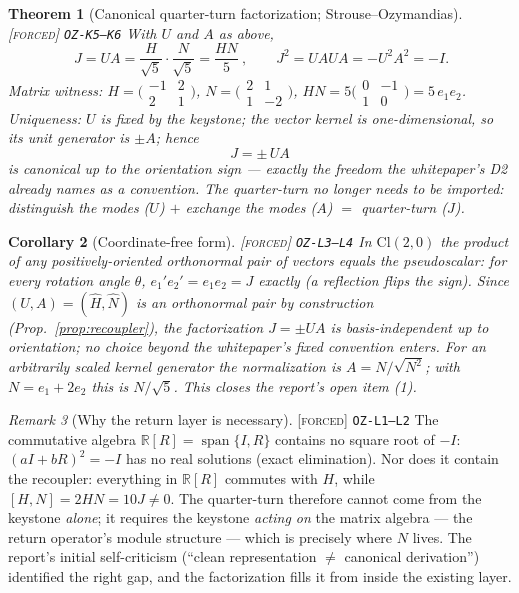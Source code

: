 \documentclass[11pt]{article}
\newcommand{\tagF}{\textcolor{cF}{\textsc{[forced]}}}
\newcommand{\hx}[1]{\textcolor{cC}{\footnotesize\texttt{#1}}}
\newcommand{\R}{\mathbb{R}}
\theoremstyle{plain}
\newtheorem{theorem}{Theorem}[section]
\newtheorem{corollary}[theorem]{Corollary}
\theoremstyle{definition}
\theoremstyle{remark}
\newtheorem{remark}[theorem]{Remark}
\begin{document}
\begin{theorem}[Canonical quarter-turn factorization; Strouse--Ozymandias]\label{thm:factorization}\tagF{} \hx{OZ-K5--K6}
With $U$ and $A$ as above,
\[
\boxed{\ J=UA=\frac{H}{\sqrt5}\cdot\frac{N}{\sqrt5}=\frac{HN}{5}\ },
\qquad J^2=UAUA=-U^2A^2=-I .
\]
Matrix witness: $H=\bigl(\begin{smallmatrix}-1&2\\2&1\end{smallmatrix}\bigr)$,
$N=\bigl(\begin{smallmatrix}2&1\\1&-2\end{smallmatrix}\bigr)$,
$HN=5\bigl(\begin{smallmatrix}0&-1\\1&0\end{smallmatrix}\bigr)=5\,e_1e_2$.
Uniqueness: $U$ is fixed by the keystone; the vector kernel is one-dimensional,
so its unit generator is $\pm A$; hence
\[
J=\pm\,UA
\]
is canonical up to the orientation sign --- exactly the freedom the whitepaper's
D2 already names as a convention. The quarter-turn no longer needs to be
imported: \emph{distinguish the modes ($U$) $+$ exchange the modes ($A$) $=$
quarter-turn ($J$)}.
\end{theorem}

\begin{corollary}[Coordinate-free form]\label{cor:coordfree}\tagF{} \hx{OZ-L3--L4}
In $\mathrm{Cl}(2,0)$ the product of any positively-oriented orthonormal pair of
vectors equals the pseudoscalar: for every rotation angle $\theta$,
$e_1'e_2'=e_1e_2=J$ exactly (a reflection flips the sign). Since
$(U,A)=(\widehat H,\widehat N)$ is an orthonormal pair \emph{by construction}
(Prop.~\ref{prop:recoupler}), the factorization $J=\pm UA$ is basis-independent
up to orientation; no choice beyond the whitepaper's fixed convention enters.
For an arbitrarily scaled kernel generator the normalization is
$A=N/\sqrt{N^2}$; with $N=e_1+2e_2$ this is $N/\sqrt5$. This closes the report's
open item (1).
\end{corollary}

\begin{remark}[Why the return layer is necessary]\label{rem:obstruction}\tagF{} \hx{OZ-L1--L2}
The commutative algebra $\R[R]=\operatorname{span}\{I,R\}$ contains no square
root of $-I$: $(aI+bR)^2=-I$ has no real solutions (exact elimination). Nor does
it contain the recoupler: everything in $\R[R]$ commutes with $H$, while
$[H,N]=2HN=10J\neq0$. The quarter-turn therefore cannot come from the keystone
\emph{alone}; it requires the keystone \emph{acting on} the matrix algebra ---
the return operator's module structure --- which is precisely where $N$ lives.
The report's initial self-criticism (``clean representation $\neq$ canonical
derivation'') identified the right gap, and the factorization fills it from
inside the existing layer.
\end{remark}
\end{document}
